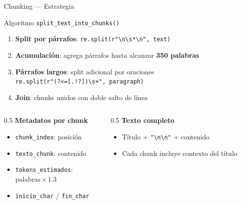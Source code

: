 \documentclass[11pt,aspectratio=169,spanish]{beamer}
\begin{document}
\begin{frame}[fragile]{Chunking — Estrategia}
    \begin{block}{Algoritmo \texttt{split\_text\_into\_chunks()}}
        \begin{enumerate}
            \item \textbf{Split por párrafos}: \texttt{re.split(r"\textbackslash n\textbackslash s*\textbackslash n", text)}
            \item \textbf{Acumulación}: agrega párrafos hasta alcanzar \textbf{350 palabras}
            \item \textbf{Párrafos largos}: split adicional por oraciones \\
              \texttt{re.split(r"(?<=[.!?])\textbackslash s+", paragraph)}
            \item \textbf{Join}: chunks unidos con doble salto de línea
        \end{enumerate}
    \end{block}

    \vspace{0.3cm}
    \begin{columns}[T]
        \begin{column}{0.5\textwidth}
            \textbf{Metadatos por chunk}
            \begin{itemize}
                \item \texttt{chunk\_index}: posición
                \item \texttt{texto\_chunk}: contenido
                \item \texttt{tokens\_estimados}:\\
                  $\text{palabras} \times 1.3$
                \item \texttt{inicio\_char} / \texttt{fin\_char}
            \end{itemize}
        \end{column}
        \begin{column}{0.5\textwidth}
            \textbf{Texto completo}
            \begin{itemize}
                \item Título + \texttt{"\textbackslash n\textbackslash n"} + contenido
                \item Cada chunk incluye contexto del título
            \end{itemize}
        \end{column}
    \end{columns}
\end{frame}
\end{document}
